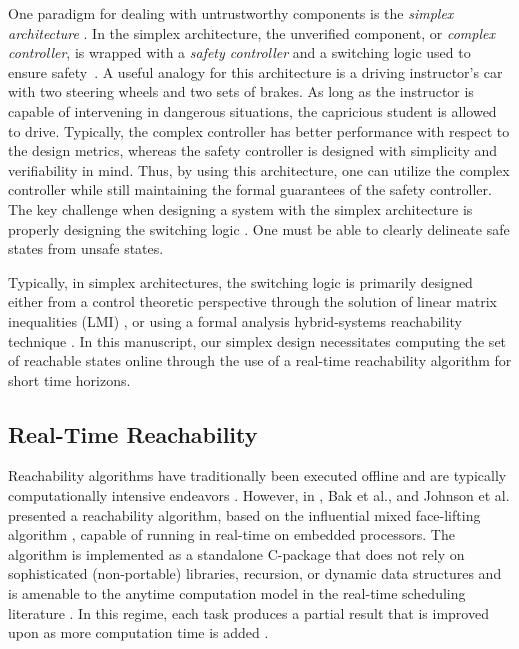 \documentclass[manuscript,screen,review]{acmart}
\begin{document}
One paradigm for dealing with untrustworthy components is the \emph{simplex architecture} \cite{RiveraAnArchitectural1996}. In the simplex architecture, the unverified component, or \emph{complex controller}, is wrapped with a \emph{safety controller} and a switching logic used to ensure safety~\cite{Bak2014}. A useful analogy for this architecture is a driving instructor's car with two steering wheels and two sets of brakes. As long as the instructor is capable of intervening in dangerous situations, the capricious student is allowed to drive. Typically, the complex controller has better performance with respect to the design metrics, whereas the safety controller is designed with simplicity and verifiability in mind. Thus, by using this architecture, one can utilize the complex controller while still maintaining the formal guarantees of the safety controller. The key challenge when designing a system with the simplex architecture is properly designing the switching logic \cite{Johnson2016}. One must be able to clearly delineate safe states from unsafe states. 

Typically, in simplex architectures, the switching logic is primarily designed either from a control theoretic perspective through the solution of linear matrix inequalities (LMI) \cite{SetoCaseStudy2000}, or using a formal analysis hybrid-systems reachability technique \cite{Bak2009Simplex}. In this manuscript, our simplex design necessitates computing the set of reachable states online through the use of a real-time reachability algorithm for short time horizons.


\subsection{Real-Time Reachability}

Reachability algorithms have traditionally been executed offline and are typically computationally intensive endeavors \cite{Chen2013,AlthoffCORA2015,manzanas2019arch_ainncs}. However, in \cite{Bak2014,Johnson2016}, Bak et al., and Johnson et al. presented a reachability algorithm, based on the influential mixed face-lifting algorithm \cite{dang2000}, capable of running in real-time on embedded processors. The algorithm is implemented as a standalone C-package that does not rely on sophisticated (non-portable) libraries, recursion, or dynamic data structures and is amenable to the anytime computation model in the real-time scheduling literature \cite{Liu1991}. In this regime, each task produces a partial result that is improved upon as more computation time is added \cite{Johnson2016}. 
\end{document}
